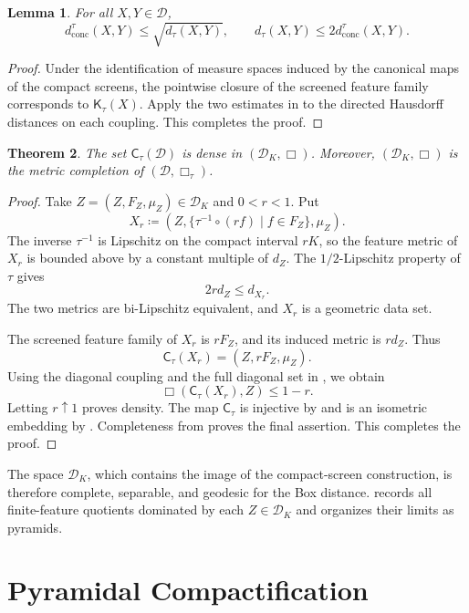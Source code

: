 \documentclass[10pt,a4paper]{amsart}
\newtheorem{theorem}{Theorem}[section]
\newtheorem{lemma}[theorem]{Lemma}
\newcommand{\D}{\mathcal D}
\newcommand{\DK}{\mathcal D_K}
\newcommand{\Kc}{\mathsf K}
\newcommand{\dconc}{d_{\mathrm{conc}}}
\newcommand{\dtau}{d_{\tau}}
\begin{document}
\begin{lemma}
\label{lem:screened-topology}
For all $X,Y\in\D$,
\[
\dconc^\tau(X,Y)\leq\sqrt{\dtau(X,Y)},\qquad
\dtau(X,Y)\leq2\dconc^\tau(X,Y).
\]
\end{lemma}

\begin{proof}
Under the identification of measure spaces induced by the canonical maps of the compact screens, the pointwise closure of the screened feature family corresponds to $\Kc_\tau(X)$. Apply the two estimates in  to the directed Hausdorff distances on each coupling. This completes the proof.
\end{proof}

\begin{theorem}
\label{thm:screen-density}
The set $\mathsf C_\tau(\D)$ is dense in $(\DK,\Box)$. Moreover, $(\DK,\Box)$ is the metric completion of $(\D,\Box_\tau)$.
\end{theorem}

\begin{proof}
Take $Z=(Z,F_Z,\mu_Z)\in\DK$ and $0<r<1$. Put
\[
X_r\coloneqq
\left(Z,\{\tau^{-1}\circ(rf)\mid f\in F_Z\},\mu_Z\right).
\]
The inverse $\tau^{-1}$ is Lipschitz on the compact interval $rK$, so the feature metric of $X_r$ is bounded above by a constant multiple of $d_Z$. The $1/2$-Lipschitz property of $\tau$ gives
\[
2r d_Z\leq d_{X_r}.
\]
The two metrics are bi-Lipschitz equivalent, and $X_r$ is a geometric data set.

The screened feature family of $X_r$ is $rF_Z$, and its induced metric is $rd_Z$. Thus
\[
\mathsf C_\tau(X_r)=(Z,rF_Z,\mu_Z).
\]
Using the diagonal coupling and the full diagonal set in , we obtain
\[
\Box(\mathsf C_\tau(X_r),Z)\leq1-r.
\]
Letting $r\uparrow1$ proves density. The map $\mathsf C_\tau$ is injective by  and is an isometric embedding by . Completeness from  proves the final assertion. This completes the proof.
\end{proof}

The space $\DK$, which contains the image of the compact-screen construction, is therefore complete, separable, and geodesic for the Box distance.  records all finite-feature quotients dominated by each $Z\in\DK$ and organizes their limits as pyramids.

\section{Pyramidal Compactification}
\label{sec:pyramid-compactification}
\end{document}
